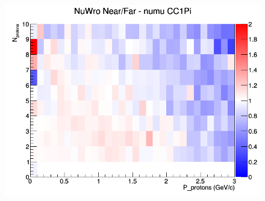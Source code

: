 \begin{figure}[h]
\endminipage
{}
\includegraphics[width=\linewidth]{N_P/nominal/protons/ratios/CC1Pi_NuWro_numu_NF_N_P.png}
\endminipage
\newline
\end{figure}
\clearpage
